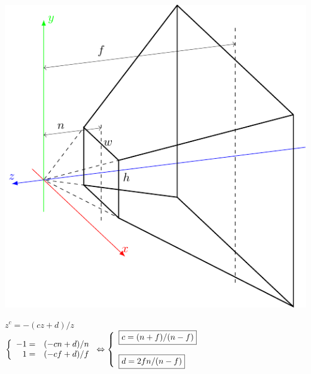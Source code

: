 \documentclass[10pt]{beamer}
\begin{document}
	\begin{frame}{}
		\begin{center}
			\includegraphics[page=4]{cvv.pdf}
		\end{center}
		
		
			$z^c = -(cz+d)/z$ \\
			
			$  
			\left\lbrace \begin{array}{rl}
				-1=	&(-cn+d) / n\\
				1 = &(-cf+d) / f\\
			\end{array}  
			\right.
			\Leftrightarrow
			\left\lbrace
			\begin{array}{l}
				\fbox{$c = (n+f) / (n-f)$} \\
				\tiny~\\
				\fbox{$d = 2fn / (n - f)$}
			\end{array}
			\right.
			$ 
		
		
		
		
	\end{frame}
	
\end{document}
